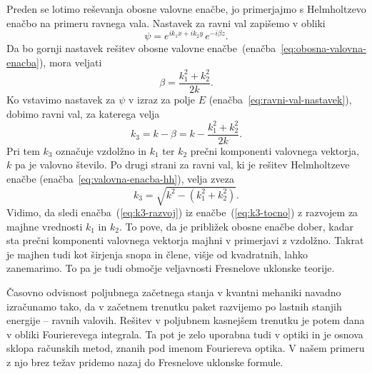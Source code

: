 Preden se lotimo reševanja obosne valovne enačbe, jo primerjajmo s Helmholtzevo enačbo
na primeru ravnega vala. Nastavek za ravni val  zapišemo v obliki
\begin{equation}
\psi=e^{ik_{1}x+ik_{2}y}\, e^{-i\beta z}.
\label{eq:ravni-val-nastavek-obosni}
\end{equation}
Da bo gornji nastavek rešitev
obosne valovne enačbe~(enačba~\ref{eq:obosna-valovna-enacba}), mora veljati 
\begin{equation}
\beta=\frac{k_{1}^{2}+k_{2}^{2}}{2k}.
\end{equation}
Ko vstavimo nastavek za $\psi$ v izraz za polje $E$ 
(enačba~\ref{eq:ravni-val-nastavek}), dobimo ravni val, za katerega velja 
\begin{equation}
k_{3}=k-\beta=k-\frac{k_{1}^{2}+k_{2}^{2}}{2k}.
\label{eq:k3-razvoj}
\end{equation}
Pri tem $k_{3}$ označuje vzdolžno in $k_{1}$ ter $k_{2}$ prečni komponenti valovnega 
vektorja, $k$ pa je valovno število. Po drugi strani za ravni val, ki je 
rešitev Helmholtzeve enačbe (enačba~\ref{eq:valovna-enacba-hh}), velja zveza
\begin{equation}
k_{3}=\sqrt{k^{2}-(k_{1}^{2}+k_{2}^{2})}.\label{eq:k3-tocno}
\end{equation}
Vidimo, da sledi enačba~(\ref{eq:k3-razvoj}) iz enačbe~(\ref{eq:k3-tocno})
z razvojem za majhne vrednosti $k_1$ in $k_2$. To pove, da je približek obosne 
enačbe dober, kadar sta prečni komponenti valovnega vektorja 
majhni v primerjavi z vzdolžno. 
Takrat je majhen tudi kot širjenja snopa in člene, višje od kvadratnih,
lahko zanemarimo. To pa je tudi območje veljavnosti Fresnelove uklonske
teorije.

\begin{remark}
Časovno odvisnost poljubnega začetnega
stanja v kvantni mehaniki navadno izračunamo tako, da v začetnem
trenutku paket razvijemo po lastnih stanjih energije -- ravnih valovih.
Rešitev v poljubnem kasnejšem trenutku je potem dana v obliki Fourierevega
integrala. Ta pot je zelo uporabna tudi v optiki in je osnova sklopa
računskih metod, znanih pod imenom Fouriereva optika. V našem primeru
z njo brez težav pridemo nazaj do Fresnelove uklonske formule.
\end{remark}

